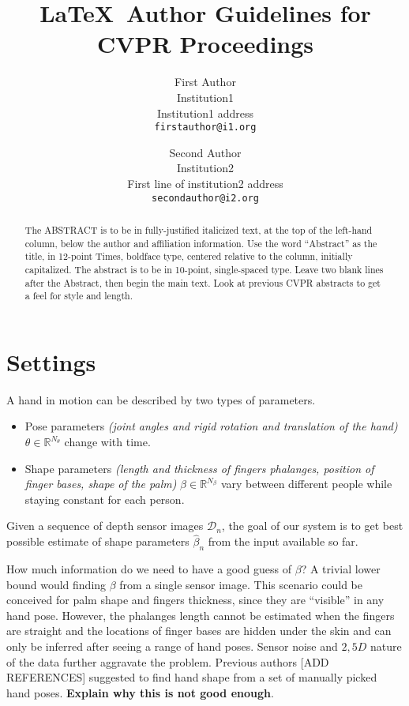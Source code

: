 \documentclass[10pt,twocolumn,letterpaper]{article}
\begin{document}
\title{\LaTeX\ Author Guidelines for CVPR Proceedings}

\author{First Author\\
Institution1\\
Institution1 address\\
{\tt\small firstauthor@i1.org}
\and
Second Author\\
Institution2\\
First line of institution2 address\\
{\tt\small secondauthor@i2.org}
}

\maketitle


\begin{abstract}
   The ABSTRACT is to be in fully-justified italicized text, at the top
   of the left-hand column, below the author and affiliation
   information. Use the word ``Abstract'' as the title, in 12-point
   Times, boldface type, centered relative to the column, initially
   capitalized. The abstract is to be in 10-point, single-spaced type.
   Leave two blank lines after the Abstract, then begin the main text.
   Look at previous CVPR abstracts to get a feel for style and length.
\end{abstract}

\section{Settings}
A hand in motion can be described by two types of parameters.
\begin{itemize}
\item Pose parameters \textit{(joint angles and rigid rotation and translation of the hand)} $\theta \in \mathbb{R}^{N_{\theta}}$ change with time. 
\item Shape parameters \textit{(length and thickness of fingers phalanges, position of finger bases, shape of the palm)} $\beta \in \mathbb{R}^{N_{\beta}}$ vary between different people while staying constant for each person. 
\end{itemize}
Given a sequence of depth sensor images $\mathcal{D}_n$, the goal of our system is to get best possible estimate of shape parameters $\hat{\beta}_n$ from the input available so far.

How much information do we need to have a good guess of $\beta$? A trivial lower bound would finding $\beta$ from a single sensor image. This scenario could be conceived for palm shape and fingers thickness, since they are ``visible'' in any hand pose. However, the phalanges length cannot be estimated when the fingers are straight and the locations of finger bases are hidden under the skin and can only be inferred after seeing a range of hand poses. Sensor noise and $2,5 D$ nature of the data further aggravate the problem. 
Previous authors [ADD REFERENCES] suggested to find hand shape from a set of manually picked hand poses. \textbf{\color{accent} Explain why this is not good enough}.
\end{document}
